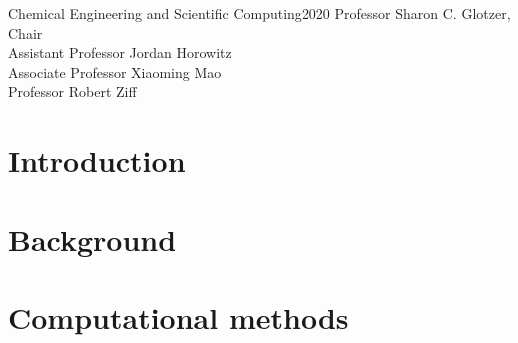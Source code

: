\documentclass[reqno,12pt,oneside]{report}  %
\begin{document}

{Chemical Engineering and Scientific Computing}{2020}
{ Professor Sharon C. Glotzer, Chair \\
  Assistant Professor Jordan Horowitz \\
  Associate Professor Xiaoming Mao \\
  Professor Robert Ziff }



\initializefrontsections



\setcounter{page}{1}


\startacknowledgementspage



\tableofcontents
\listoffigures
\listoftables

\startabstractpage



\startthechapters


\chapter{Introduction}
\label{ch:intro}


\chapter{Background}
\label{ch:background}


\chapter{Computational methods}
\label{ch:methods}

\end{document}
